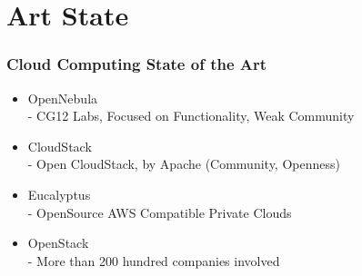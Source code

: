 \section{Art State}

\begin{frame}[allowframebreaks]
\frametitle{Cloud Computing State of the Art }

\begin{itemize}
	\item OpenNebula \\
	- CG12 Labs, Focused on Functionality, Weak Community
	\item CloudStack \\
	- Open CloudStack, by Apache (Community, Openness)
	\item Eucalyptus \\ 
	- OpenSource AWS Compatible Private Clouds
	\item OpenStack \\
	- More than 200 hundred companies involved
\end{itemize}

\end{frame}
